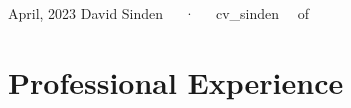\documentclass[11pt, a4paper]{awesome-cv}
\begin{document}
\makecvheader

\makecvfooter
  {April, 2023}
    {David Sinden~~~·~~~cv\_sinden}
  {\thepage\ ~of~ \pageref{LastPage}}



\hypertarget{research-positions}{\section{Professional Experience}\label{professional-experience}}
\end{document}
